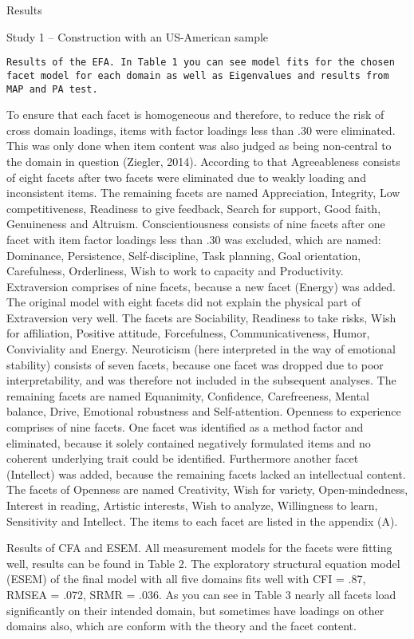 \documentclass[man]{apa6}
\theoremstyle{definition}
\theoremstyle{definition}
\theoremstyle{definition}
\theoremstyle{remark}
\begin{document}
Results

Study 1 -- Construction with an US-American sample

\begin{verbatim}
Results of the EFA. In Table 1 you can see model fits for the chosen facet model for each domain as well as Eigenvalues and results from MAP and PA test.
\end{verbatim}

To ensure that each facet is homogeneous and therefore, to reduce the
risk of cross domain loadings, items with factor loadings less than .30
were eliminated. This was only done when item content was also judged as
being non-central to the domain in question (Ziegler, 2014). According
to that Agreeableness consists of eight facets after two facets were
eliminated due to weakly loading and inconsistent items. The remaining
facets are named Appreciation, Integrity, Low competitiveness, Readiness
to give feedback, Search for support, Good faith, Genuineness and
Altruism. Conscientiousness consists of nine facets after one facet with
item factor loadings less than .30 was excluded, which are named:
Dominance, Persistence, Self-discipline, Task planning, Goal
orientation, Carefulness, Orderliness, Wish to work to capacity and
Productivity. Extraversion comprises of nine facets, because a new facet
(Energy) was added. The original model with eight facets did not explain
the physical part of Extraversion very well. The facets are Sociability,
Readiness to take risks, Wish for affiliation, Positive attitude,
Forcefulness, Communicativeness, Humor, Conviviality and Energy.
Neuroticism (here interpreted in the way of emotional stability)
consists of seven facets, because one facet was dropped due to poor
interpretability, and was therefore not included in the subsequent
analyses. The remaining facets are named Equanimity, Confidence,
Carefreeness, Mental balance, Drive, Emotional robustness and
Self-attention. Openness to experience comprises of nine facets. One
facet was identified as a method factor and eliminated, because it
solely contained negatively formulated items and no coherent underlying
trait could be identified. Furthermore another facet (Intellect) was
added, because the remaining facets lacked an intellectual content. The
facets of Openness are named Creativity, Wish for variety,
Open-mindedness, Interest in reading, Artistic interests, Wish to
analyze, Willingness to learn, Sensitivity and Intellect. The items to
each facet are listed in the appendix (A).

Results of CFA and ESEM. All measurement models for the facets were
fitting well, results can be found in Table 2. The exploratory
structural equation model (ESEM) of the final model with all five
domains fits well with CFI = .87, RMSEA = .072, SRMR = .036. As you can
see in Table 3 nearly all facets load significantly on their intended
domain, but sometimes have loadings on other domains also, which are
conform with the theory and the facet content.
\end{document}
